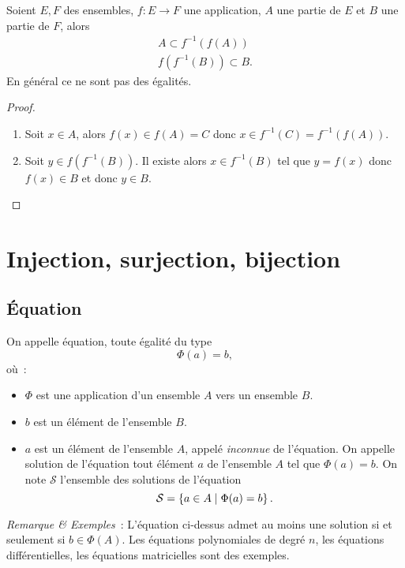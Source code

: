 %
\begin{prop}
  Soient \(E,F\) des ensembles, \(f:E\longrightarrow F\) une application, \(A\) une partie de \(E\) et \(B\) une partie de \(F\), alors
  \begin{gather}
    A \subset f^{-1}(f(A)) \\
    f(f^{-1}(B)) \subset B.
  \end{gather}
  En général ce ne sont pas des égalités.
\end{prop}
\begin{proof}
  \begin{enumerate}
  \item Soit \(x \in A\), alors \(f(x) \in f(A) = C\) donc \(x \in f^{-1}(C)=f^{-1}(f(A))\).
  \item Soit \(y \in f(f^{-1}(B))\). Il existe alors \(x \in f^{-1}(B)\) tel que \(y=f(x)\) donc \(f(x) \in B\) et donc \(y \in B\).
  \end{enumerate}
\end{proof}
%
\section{Injection, surjection, bijection}
\label{chap3-sec:injsurbij}
%
%
\subsection{Équation}
\label{chap3-subsec:equation}
\begin{defdef}
  On appelle équation, toute égalité du type
  \begin{equation}
    \Phi(a)=b,
  \end{equation}
  où~:
  \begin{itemize}
  \item \(\Phi\) est une application d'un ensemble \(A\) vers un ensemble \(B\).
  \item \(b\) est un élément de l'ensemble \(B\).
  \item \(a\) est un élément de l'ensemble \(A\), appelé \emph{inconnue} de l'équation. On appelle solution de l'équation tout élément \(a\) de l'ensemble \(A\) tel que \(\Phi(a)=b\). On note \(\mathcal{S}\) l'ensemble des solutions de l'équation
    \begin{equation}
      \mathcal{S} = \left\{a \in A\mathrel{}\middle|\mathrel{}\Phi(a)=b\right\}.
    \end{equation}
  \end{itemize}
\end{defdef}
\emph{Remarque \& Exemples}~: L'équation ci-dessus admet au moins une solution si et seulement si \(b \in \Phi(A)\). Les équations polynomiales de degré \(n\), les équations différentielles, les équations matricielles sont des exemples.
%
